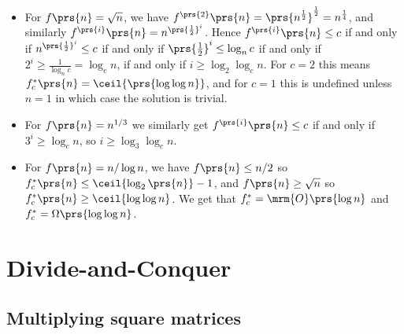 \documentclass[oneside]{scrbook}
\theoremstyle{definition}
\begin{document}
\begin{problem}
\begin{itemize}
\item
For $f\prs{n} = \sqrt{n}$, we have $f^{\prs{2}}\prs{n} = \prs{n^{\frac{1}{2}}}^{\frac{1}{2}} = n^{\frac{1}{4}}$, and similarly $f^{\prs{i}}\prs{n} = n^{\prs{\frac{1}{2}}^i}$. Hence $f^{\prs{i}}\prs{n} \leq c$ if and only if $n^{\prs{\frac{1}{2}}^i} \leq c$ if and only if $\prs{\frac{1}{2}}^i \leq \log_n c$ if and only if $2^i \geq \frac{1}{\log_n c} = \log_c n$, if and only if $i \geq \log_2 \log_c n$. For $c = 2$ this means $f_c^*\prs{n} = \ceil{\prs{\log \log n}}$, and for $c = 1$ this is undefined unless $n=1$ in which case the solution is trivial.

\item
For $f\prs{n} = n^{1/3}$ we similarly get $f^{\prs{i}}\prs{n} \leq c$ if and only if $3^i \geq \log_c n$, so $i \geq \log_3 \log_c n$.

\item
For $f\prs{n} = n / \log n$, we have $f\prs{n} \leq n/2$ so $f^*_c\prs{n} \leq \ceil{\log_2\prs{n}} - 1$, and $f\prs{n} \geq \sqrt{n}$ so $f^*_c\prs{n} \geq \ceil{\log \log n}$. We get that $f^*_c = \mrm{O}\prs{\log n}$ and $f^*_c = \Omega\prs{\log \log n}$.
\end{itemize}
\end{problem}

\chapter{Divide-and-Conquer}

\section{Multiplying square matrices}
\end{document}
